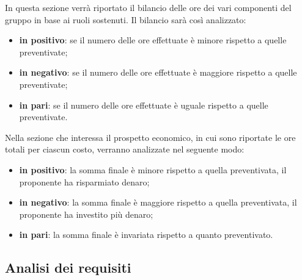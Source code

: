 
In questa sezione verrà riportato il bilancio delle ore dei vari componenti del gruppo in base ai ruoli sostenuti. Il bilancio sarà così analizzato:
\begin{itemize}
	\item {\bfseries in positivo}: se il numero delle ore effettuate è minore rispetto a quelle preventivate;
	\item {\bfseries in negativo}: se il numero delle ore effettuate è maggiore rispetto a quelle preventivate;
	\item {\bfseries in pari}: se il numero delle ore effettuate è uguale rispetto a quelle preventivate. \\
\end{itemize}
Nella sezione che interessa il prospetto economico, in cui sono riportate le ore totali per ciascun costo, verranno analizzate nel seguente modo:
\begin{itemize}
	\item {\bfseries in positivo}: la somma finale è minore rispetto a quella preventivata, il proponente ha risparmiato denaro;
	\item {\bfseries in negativo}: la somma finale è maggiore rispetto a quella preventivata, il proponente ha investito più denaro;
	\item {\bfseries in pari}: la somma finale è invariata rispetto a quanto preventivato. \\
\end{itemize}
\subsection {Analisi dei requisiti}
